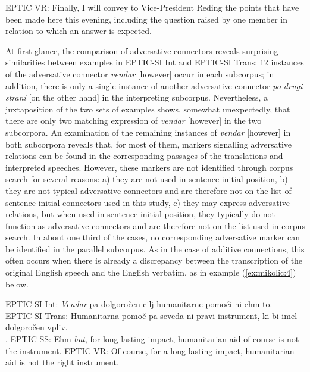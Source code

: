 \documentclass[output=paper]{langscibook}
\begin{document}
\ex
\glt EPTIC VR: Finally, I will convey to Vice-President Reding the points that have been made here this evening, including the question raised by one member in relation to which an answer is expected.
\z
\z

At first glance, the comparison of adversative connectors reveals surprising similarities between examples in EPTIC-SI Int and EPTIC-SI Trans: 12 instances of the adversative connector \textit{vendar} [however] occur in each subcorpus; in addition, there is only a single instance of another adversative connector \textit{po drugi strani} [on the other hand] in the interpreting subcorpus. Nevertheless, a juxtaposition of the two sets of examples shows, somewhat unexpectedly, that there are only two matching expression of \textit{vendar} [however] in the two subcorpora. An examination of the remaining instances of \textit{vendar} [however] in both subcorpora reveals that, for most of them, markers signalling adversative relations can be found in the corresponding passages of the translations and interpreted speeches. However, these markers are not identified through corpus search for several reasons: a) they are not used in sentence-initial position, b) they are not typical adversative connectors and are therefore not on the list of sentence-initial connectors used in this study, c) they may express adversative relations, but when used in sentence-initial position, they typically do not function as adversative connectors and are therefore not on the list used in corpus search. In about one third of the cases, no corresponding adversative marker can be identified in the parallel subcorpus. As in the case of additive connections, this often occurs when there is already a discrepancy between the transcription of the original English speech and the English verbatim, as in example (\ref{ex:mikolic:4}) below. 

\ea\label{ex:mikolic:4}
\ea
EPTIC-SI Int: \textit{Vendar} pa dolgoročen cilj humanitarne pomoči ni ehm to.\\
\ex
EPTIC-SI Trans: Humanitarna pomoč pa seveda ni pravi instrument, ki bi imel dolgoročen vpliv.\\
.
\ex
EPTIC SS: Ehm \textit{but}, for long-lasting impact, humanitarian aid of course is not the instrument.
\ex
EPTIC VR: Of course, for a long-lasting impact, humanitarian aid is not the right instrument.
\z
\z
\end{document}
